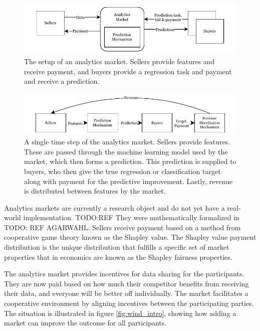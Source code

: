 \begin{figure}
  \centering
  \includegraphics{Pictures/analytics_market.pdf}
  \caption{The setup of an analytics market. Sellers provide features and
  receive payment, and buyers provide a regression task and payment and receive
  a prediction.}
  \label{fig:analytics_market}
\end{figure}
\begin{figure}
  \centering
  \includegraphics{Pictures/analytics_market_time_step.pdf}
  \caption{A single time step of the analytics market. Sellers provide
  features. These are passed through the machine learning model used by the
  market, which then forms a prediction. This prediction is supplied to buyers,
  who then give the true regression or classification target along with payment
  for the predictive improvement. Lastly, revenue is distributed between
  features by the market.}
  \label{fig:analytics_market_time_step}
\end{figure}


Analytics markets are currently a research object and do not yet have a
real-world implementation. TODO:REF They were mathematically formalized in
TODO: REF AGARWAHL. Sellers receive payment based on a method from cooperative
game theory known as the Shapley value. The Shapley value payment distribution
is the unique distribution that fulfills a specific set of market properties
that in economics are known as the Shapley fairness properties.

The analytics market provides incentives for data sharing for the participants.
They are now paid based on how much their competitor benefits from receiving
their data, and everyone will be better off individually. The market
facilitates a cooperative environment by aligning incentives between the
participating parties. The situation is illustrated in figure
\ref{fig:wind_intro}, showing how adding a market can improve the outcome for
all participants.


